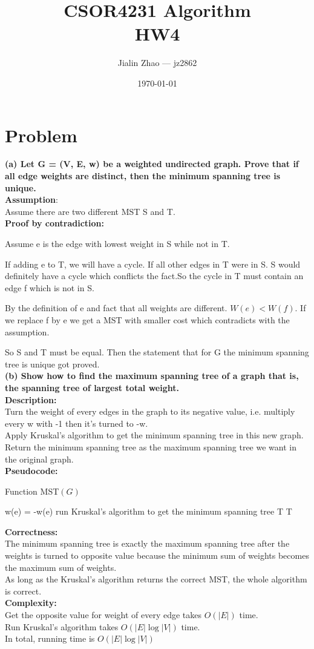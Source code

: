 \documentclass{article}
\title{CSOR4231 Algorithm\\HW4}
\author{Jialin Zhao --- jz2862}
\date{\today}
\begin{document}
 
\maketitle{} 
\section{Problem \uppercase\expandafter{}} 
\textbf{(a) Let G = (V, E, w) be a weighted undirected graph. Prove that if all edge weights are distinct, then the minimum spanning tree is unique.\\}
\textbf{Assumption}:\\
Assume there are two different MST S and T.\\
\textbf{Proof by contradiction:}

Assume e is the edge with lowest weight in S while not in T.

If adding e to T, we will have a cycle. If all other edges in T were in S. S would definitely have a cycle which conflicts the fact.So the cycle in T must contain an edge f which is not in S.

By the definition of e and fact that all weights are different. $W(e)<W(f)$. If we replace f by e we get a MST with smaller cost which contradicts with the assumption.

So S and T must be equal. Then the statement that for G the minimum spanning tree is unique got proved.\\
\textbf{(b) Show how to find the maximum spanning tree of a graph that is, the spanning
tree of largest total weight.}\\
\textbf{\large Description:}\\
Turn the weight of every edges in the graph to its negative value, i.e. multiply every w with -1 then it's turned to -w.\\
Apply Kruskal’s algorithm to get the minimum spanning tree in this new graph.
Return the minimum spanning tree as the maximum spanning tree we want in the original graph.\\
\textbf{\large Pseudocode:}
\begin{algorithm}[H]
  \caption{Function MST$(G)$}
  \label{alg1}
  \begin{algorithmic}
  \STATE w(e) = -w(e)
  \ENDFOR
  \STATE run Kruskal’s algorithm to get the minimum spanning tree T
  \RETURN T
  \end{algorithmic}
\end{algorithm}
\noindent\textbf{\large Correctness:\\}
The minimum spanning tree is exactly the maximum spanning tree after the weights is turned to opposite value because the minimum sum of weights becomes the maximum sum of weights.\\
As long as the Kruskal’s algorithm returns the correct MST, the whole algorithm is correct.\\
\textbf{\large Complexity:\\}
Get the opposite value for weight of every edge takes $O(|E|)$ time.\\
Run Kruskal’s algorithm takes $O(|E|\log |V|)$ time.\\
In total, running time is $O(|E|\log |V|)$\\
\end{document}

